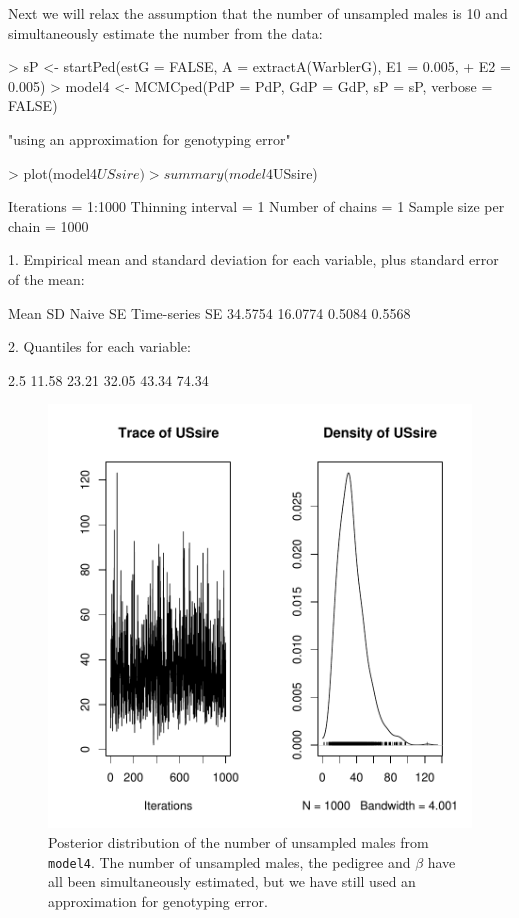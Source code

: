 \documentclass{article}
\begin{document}
Next we will relax the assumption that the number of unsampled males is 10 and simultaneously estimate the number from the data:

\begin{Schunk}
\begin{Sinput}
> sP <- startPed(estG = FALSE, A = extractA(WarblerG), E1 = 0.005, 
+     E2 = 0.005)
> model4 <- MCMCped(PdP = PdP, GdP = GdP, sP = sP, verbose = FALSE)
\end{Sinput}
\begin{Soutput}
[1] "using an approximation for genotyping error"
\end{Soutput}
\begin{Sinput}
> plot(model4$USsire)
> summary(model4$USsire)
\end{Sinput}
\begin{Soutput}
Iterations = 1:1000
Thinning interval = 1 
Number of chains = 1 
Sample size per chain = 1000 

1. Empirical mean and standard deviation for each variable,
   plus standard error of the mean:

          Mean             SD       Naive SE Time-series SE 
       34.5754        16.0774         0.5084         0.5568 

2. Quantiles for each variable:

 2.5%
11.58 23.21 32.05 43.34 74.34 
\end{Soutput}
\end{Schunk}


\begin{figure}[!h]
\begin{center}
\includegraphics{Tutorial-031}
\end{center}
\caption{Posterior distribution of the number of unsampled males from \texttt{model4}. The number of unsampled males, the pedigree and $\beta$ have all been simultaneously estimated, but we have still used an approximation for genotyping error.}
\label{model4US-fig}
\end{figure}
\end{document}
